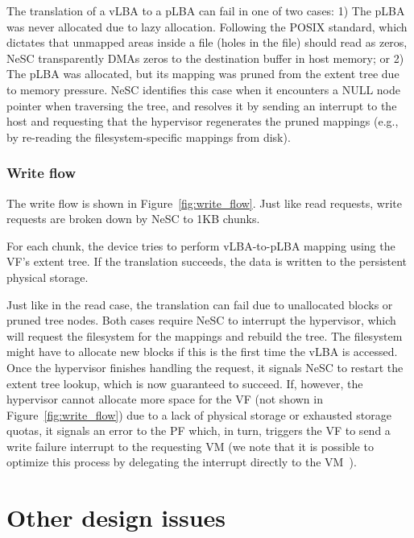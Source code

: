 The translation of a vLBA to a pLBA can fail in one of two cases:
  1) The pLBA was never allocated due to lazy allocation. Following the POSIX standard, which dictates that unmapped areas inside a file (holes in the file) should read as zeros, NeSC transparently DMAs zeros to the destination buffer in host memory; or
  2) The pLBA was allocated, but its mapping was pruned from the extent tree due to memory pressure. NeSC identifies this case when it encounters a NULL node pointer when traversing the tree, and resolves it by sending an interrupt to the host and requesting that the hypervisor regenerates the pruned mappings (e.g., by re-reading the filesystem-specific mappings from disk).

\subsubsection{Write flow}
\label{des:write}

The write flow is shown in Figure~\ref{fig:write_flow}. Just like read requests, write requests are broken down by NeSC to 1KB chunks.

For each chunk, the device tries to perform vLBA-to-pLBA mapping using the VF's extent tree. If the translation succeeds, the data is written to the persistent physical storage.

Just like in the read case, the translation can fail due to unallocated blocks or pruned tree nodes. Both cases require NeSC to interrupt the hypervisor, which will request the filesystem for the mappings and rebuild the tree. The filesystem might have to allocate new blocks if this is the first time the vLBA is accessed. Once the hypervisor finishes handling the request, it signals NeSC to restart the extent tree lookup, which is now guaranteed to succeed.
%
If, however, the hypervisor cannot allocate more space for the VF (not shown in Figure~\ref{fig:write_flow}) due to a lack of physical storage or exhausted storage quotas, it signals an error to the PF which, in turn, triggers the VF to send a write failure interrupt to the requesting VM (we note that it is possible to optimize this process by delegating the interrupt directly to the VM~\cite{gordon12eli}).

\section{Other design issues}
